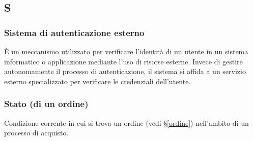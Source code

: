 \subsection{S}
\subsubsection{Sistema di autenticazione esterno}
È un meccanismo utilizzato per verificare l'identità di un utente in un sistema informatico o applicazione mediante l'uso di risorse esterne. 
Invece di gestire autonomamente il processo di autenticazione, il sistema si affida a un servizio esterno specializzato per verificare le credenziali dell'utente.

\subsubsection{Stato (di un ordine)}
Condizione corrente in cui si trova un ordine (vedi \S\ref{ordine}) nell'ambito
di un processo di acquisto.

\newpage

